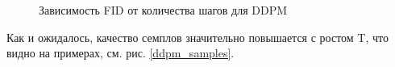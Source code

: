 \documentclass{article}
\begin{document}
\begin{figure}[H]
	\caption{Зависимость FID от количества шагов для DDPM}\label{ddpm_fid}
\end{figure}

Как и ожидалось, качество семплов значительно повышается с ростом T, что видно на примерах, см. рис. \ref{ddpm_samples}.
\end{document}
